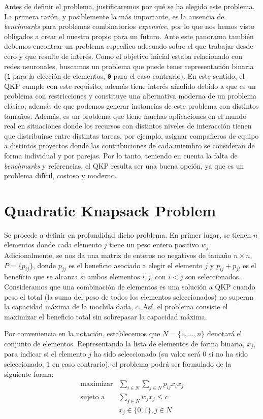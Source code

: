 Antes de definir el problema, justificaremos por qué se ha elegido este problema. 
La primera razón, y posiblemente la más importante, es la ausencia de \textit{benchmarks} para problemas combinatorios \textit{expensive}, por lo que nos hemos visto obligados a crear el nuestro propio para un futuro. 
Ante este panorama también debemos encontrar un problema específico adecuado sobre el que trabajar desde cero y que resulte de interés. 
Como el objetivo inicial estaba relacionado con redes neuronales, buscamos un problema que puede tener representación binaria (\texttt{1} para la elección de elementos, \texttt{0} para el caso contrario). 
En este sentido, el QKP cumple con este requisito, además tiene interés añadido debido a que es un problema con restricciones y constituye una alternativa moderna de un problema clásico; además de que podemos generar instancias de este problema con distintos tamaños. 
Además, es un problema que tiene muchas aplicaciones en el mundo real en situaciones donde los recursos con distintos niveles de interacción tienen que distribuirse entre distintas tareas, por ejemplo, asignar compañeros de equipo a distintos proyectos donde las contribuciones de cada miembro se consideran de forma individual y por parejas. 
Por lo tanto, teniendo en cuenta la falta de \textit{benchmarks} y referencias, el QKP resulta ser una buena opción, ya que es un problema difícil, costoso y moderno. 


\section{Quadratic Knapsack Problem}
Se procede a definir en profundidad dicho problema. 
En primer lugar, se tienen $n$ elementos donde cada elemento $j$ tiene un peso entero positivo $w_j$. 
Adicionalmente, se nos da una matriz de enteros no negativos de tamaño $n\times n$, $P = \{p_{ij}\}$, donde $p_{jj}$ es el beneficio asociado a elegir el elemento $j$ y $p_{ij}+p_{ji}$ es el beneficio que se alcanza si ambos elementos $i,j$, con $i<j$ son seleccionados. 
Consideramos que una combinación de elementos es una solución a QKP cuando peso el total (la suma del peso de todos los elementos seleccionados) no superan la capacidad máxima de la mochila dada, $c$. 
Así, el problema consiste el maximizar el beneficio total sin sobrepasar la capacidad máxima.

Por conveniencia en la notación, establecemos que $N=\{1,\dots,n\}$ denotará el conjunto de elementos. 
Representando la lista de elementos de forma binaria, $x_j$, para indicar si el elemento $j$ ha sido seleccionado (su valor será 0 si no ha sido seleccionado, 1 en caso contrario), el problema podrá ser formulado de la siguiente forma:
\begin{equation}
\begin{aligned}
  \text{maximizar} & \sum_{i\in N}\sum_{j\in N}p_{ij}x_ix_j \\
  \text{sujeto a } & \sum_{j\in N}w_jx_j \leq c\\
  & x_j\in \{0,1\}, j \in N 
\end{aligned}
\label{eq:QKP}
\end{equation}

